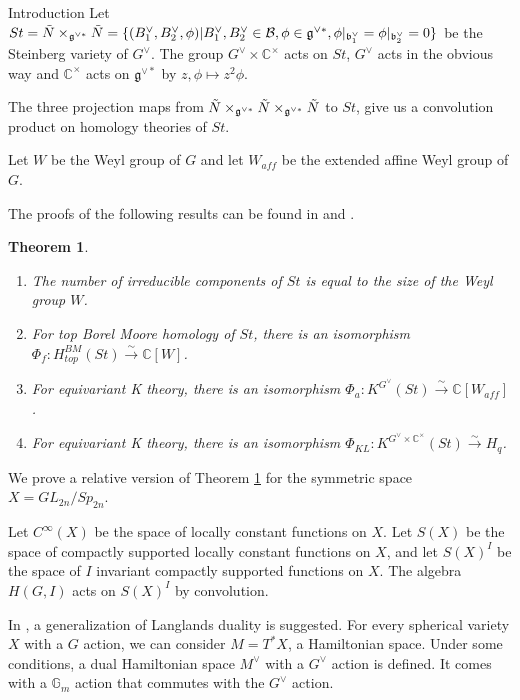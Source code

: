 \documentclass[12pt]{article}
\newcommand{\B}{\mathcal{B}}
\newcommand{\C}{\mathbb{C}}
\newcommand{\<}{\langle}
\renewcommand{\>}{\rangle}
\theoremstyle{plain}
\newtheorem{theorem}{Theorem}[section]
\theoremstyle{definition}
\begin{document}
\begin{section}{Introduction}
 Let $St=\Tilde{N}\times_{\mathfrak{g}^{\vee*}}\Tilde{N}=\{(B^\vee_1,B^\vee_2,\phi)|B^\vee_1,B^\vee_2\in\B, \phi\in \mathfrak{g}^{\vee*}, \phi|_{\mathfrak{b}_1^\vee}=\phi|_{\mathfrak{b}_2^\vee}=0\}$ be the Steinberg variety of $G^\vee$. The group $G^\vee\times\C^\times$ acts on $St$, $G^\vee$ acts in the obvious way and $\C^\times$ acts on $\mathfrak{g}^{\vee*}$ by $z,\phi\mapsto z^2\phi$.

    The three projection maps from $\Tilde{N}\times_{\mathfrak{g}^{\vee*}}\Tilde{N}\times_{\mathfrak{g}^{\vee*}}\Tilde{N}$ to $St$, give us a convolution product on homology theories of $St$.


    Let $W$ be the Weyl group of $G$ and let $W_{aff}$ be the extended affine Weyl group of $G$.

The proofs of the following results can be found in \cite{Kazhdan1987ProofOT} and  \cite{Chriss1997RepresentationTA} .


\begin{theorem}\label{classic}
    \begin{enumerate}
     \item The number of irreducible components of $St$ is equal to the size of the Weyl group $W$.
    
        \item For top Borel Moore homology of $St$, there is an isomorphism $\Phi_f:H^{BM}_{top}(St)\xrightarrow{\sim}\mathbb{C}[W]$. 
        \item For equivariant K theory, there is an isomorphism  $\Phi_a:K^{G^\vee}(St)\xrightarrow{\sim} \mathbb{C}[W_{aff}]$.
        \item For equivariant K theory, there is an isomorphism $\Phi_{KL}:K^{G^\vee\times \mathbb{C}^\times}(St)\xrightarrow{\sim} H_q$. 
    \end{enumerate}
\end{theorem}

We prove a relative version of Theorem \ref{classic} for the symmetric space $X=GL_{2n}/Sp_{2n}$.

Let $C^\infty(X)$ be the space of locally constant functions on $X$. Let $S(X)$ be the space of compactly supported locally constant functions on $X$, and let $S(X)^I$ be the space of $I$ invariant compactly supported functions on $X$. The algebra $H(G,I)$ acts on $S(X)^I$ by convolution.

In \cite{benzvi2024relativelanglandsduality}, a generalization of Langlands duality is suggested. For every spherical variety $X$ with a $G$ action, we can consider $M=T^*X$, a Hamiltonian space. Under some conditions, a dual Hamiltonian space $M^\vee$ with a $G^\vee$ action is defined. It comes with a $\mathbb{G}_m$ action that commutes with the $G^\vee$ action.


\end{section}
\end{document}
